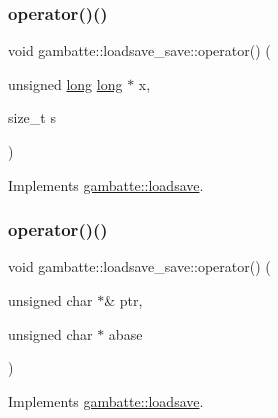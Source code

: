 \subsubsection{\texorpdfstring{operator()()}{operator()()}\hspace{0.1cm}{\footnotesize\ttfamily [17/19]}}
{\footnotesize\ttfamily void gambatte\+::loadsave\+\_\+save\+::operator() (\begin{DoxyParamCaption}\item[{unsigned \hyperlink{ioapi_8h_a3c7b35ad9dab18b8310343c201f7b27e}{long} \hyperlink{ioapi_8h_a3c7b35ad9dab18b8310343c201f7b27e}{long} $\ast$}]{x,  }\item[{size\+\_\+t}]{s }\end{DoxyParamCaption})\hspace{0.3cm}{\ttfamily [virtual]}}



Implements \hyperlink{classgambatte_1_1loadsave_a93ef67515dbf61461e7370c9cc77c8a6}{gambatte\+::loadsave}.

\mbox{\label{classgambatte_1_1loadsave__save_a5b38424b1f911e556303de3521424b1e}} 
\subsubsection{\texorpdfstring{operator()()}{operator()()}\hspace{0.1cm}{\footnotesize\ttfamily [18/19]}}
{\footnotesize\ttfamily void gambatte\+::loadsave\+\_\+save\+::operator() (\begin{DoxyParamCaption}\item[{unsigned char $\ast$\&}]{ptr,  }\item[{unsigned char $\ast$}]{abase }\end{DoxyParamCaption})\hspace{0.3cm}{\ttfamily [virtual]}}



Implements \hyperlink{classgambatte_1_1loadsave_a911a5ce78fbb8c4ceb36984a9967ea72}{gambatte\+::loadsave}.

\mbox{\label{classgambatte_1_1loadsave__save_ab01cad527821d3a04eea9fae06d1e4bf}} 
